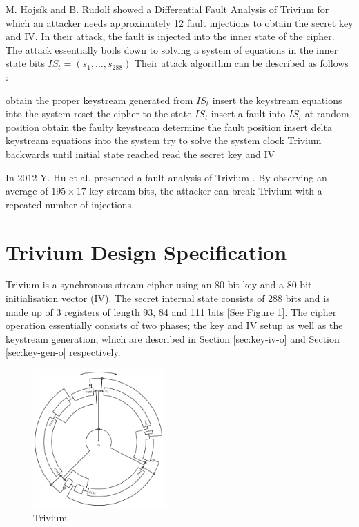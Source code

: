 \documentclass[conference]{IEEEtran}
\begin{document}
M. Hojsík and B. Rudolf \cite{Hojsik2008} showed a Differential Fault Analysis of Trivium for which an attacker needs approximately 12 fault injections to obtain the secret key and IV. In their attack, the fault is injected into the inner state of the cipher. 
The attack essentially boils down to solving a system of equations in the inner state bits $IS_t = (s_1,\dots, s_{288})$
Their attack algorithm can be described as follows \cite{Hojsik2008}:
\begin{algorithmic}[1]
\State obtain the proper keystream generated from $IS_t$ 
\State insert the keystream equations into the system 
\State reset the cipher to the state $IS_t$
\State insert a fault into $IS_t$ at random position
\State obtain the faulty keystream
\State determine the fault position
\State insert delta keystream equations into the system
\State try to solve the system
\EndWhile
\State clock Trivium backwards until initial state reached
\State read the secret key and IV
\end{algorithmic}

In 2012 Y. Hu et al. presented a fault analysis of Trivium \cite{Hu2012}. By observing an average of $195 \times 17$ key-stream bits, the attacker can break Trivium with a repeated number of injections. 

\section{Trivium Design Specification}\label{sec:spec}

Trivium is a synchronous stream cipher using an 80-bit key and a 80-bit initialisation vector (IV). The secret internal state consists of 288 bits and is made up of 3 registers of length 93, 84 and 111 bits [See Figure \ref{fig:circle}]. The cipher operation essentially consists of two phases; the key and IV setup as well as the keystream generation, which are described in Section \ref{sec:key-iv-o} and Section \ref{sec:key-gen-o} respectively.

\begin{figure}[H]
\centering
\includegraphics[width=0.45\textwidth]{figures/round.png}
\caption{Trivium \cite{circle}}
\label{fig:circle}
\end{figure}
\end{document}
